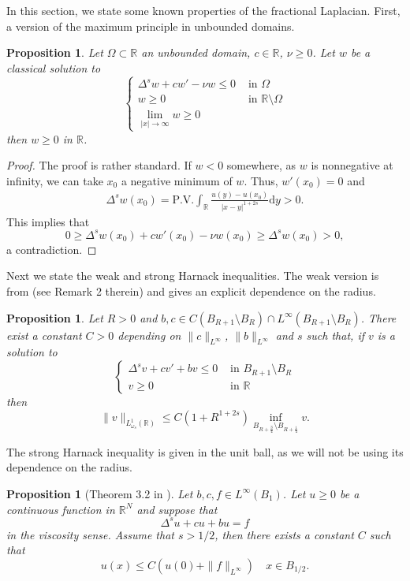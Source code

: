 \documentclass[11pt,a4paper]{amsart}
\newcommand{\R}{\mathbb{R}}
\newcommand{\PV}{\mathrm{P.V.}}
\newcommand{\inSet}[1]{\text{ in } {#1}}
\newcommand{\Lomega}{L^1_{\omega_s}(\R)}
\newcommand{\dy}{\mathrm{d}y}
\newtheorem{prop}[thm]{Proposition}
\begin{document}
In this section, we state some known properties of the fractional Laplacian. First, a version of the maximum principle in unbounded domains.
\begin{prop}
\label{prop:mp}
Let $\Omega\subset \R$ an unbounded domain, $c\in \R$, $\nu\geq 0$. Let $w$ be a classical solution to 
\[\begin{cases}
\Delta^s w + c w' - \nu w \leq 0 & \inSet{\Omega} \\
w \geq 0 & \inSet{\R \setminus \Omega} \\
\lim_{|x|\rightarrow \infty} w \geq 0 &
\end{cases}\]
then $w \geq 0$ in $\R$.
\end{prop}

\begin{proof}
The proof is rather standard. If $w < 0$ somewhere, as $w$ is nonnegative at infinity, we can take $x_0$ a negative minimum of $w$. Thus, $w'(x_0) = 0$ and 
\begin{align*}
\Delta^sw(x_0) = \PV \int_{\R} \frac{u(y) - u(x_0)}{|x-y|^{1+2s}} \dy > 0.
\end{align*}
This implies that
\[0 \geq \Delta^s w(x_0) + c w'(x_0) - \nu w(x_0) \geq \Delta^s w(x_0) > 0,\]
a contradiction.
\end{proof}

Next we state the weak and strong Harnack inequalities. The weak version is from \cite{FN25} (see Remark 2 therein) and gives an explicit dependence on the radius.
\begin{prop}
\label{prop:weak_harnack}
Let $R> 0$ and $b,c \in C(B_{R+1} \setminus B_R) \cap L^{\infty}(B_{R+1}\setminus B_R)$. There exist a constant $C>0$ depending on $\|c\|_{L^{\infty}}$, $\|b\|_{L^{\infty}}$ and $s$ such that, if $v$ is a solution to  
\[\begin{cases}
\Delta^s v + c v' + bv \leq 0 & \inSet{B_{R+1} \setminus B_R} \\ 
v\geq 0 & \inSet{\R}
\end{cases}\]
then
\[\|v\|_{\Lomega} \leq C(1+R^{1+2s}) \inf_{B_{R+\frac34} \setminus B_{R+\frac14}}v.\]
\end{prop}

The strong Harnack inequality is given in the unit ball, as we will not be using its dependence on the radius.
\begin{prop}[Theorem 3.2 in \cite{DQT23}]
\label{prop:harnack}
Let $b,c, f \in L^{\infty}( B_1)$. Let $u \geq 0$ be a continuous function in $\mathbb{R}^N$ and suppose that
\[
\Delta^s u + c u + bu = f
\]
in the viscosity sense. Assume that $s > 1/2$, then there exists a constant $C$ such that
\[
u(x) \leq C \left(u(0) + \|f\|_{L^{\infty}} \right) \quad x \in B_{1/2}.
\]
\end{prop}
\end{document}
